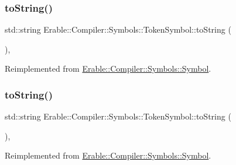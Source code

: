\mbox{\label{class_erable_1_1_compiler_1_1_symbols_1_1_token_symbol_a0f8499152ff070ae70295c9b25b25b93}} 
\subsubsection{\texorpdfstring{toString()}{toString()}\hspace{0.1cm}{\footnotesize\ttfamily [1/2]}}
{\footnotesize\ttfamily std\+::string Erable\+::\+Compiler\+::\+Symbols\+::\+Token\+Symbol\+::to\+String (\begin{DoxyParamCaption}{ }\end{DoxyParamCaption})\hspace{0.3cm}{\ttfamily [override]}, {\ttfamily [virtual]}}



Reimplemented from \mbox{\hyperlink{class_erable_1_1_compiler_1_1_symbols_1_1_symbol_af5ccb3fb3201fd88ab6ce0e495416c82}{Erable\+::\+Compiler\+::\+Symbols\+::\+Symbol}}.

\mbox{\label{class_erable_1_1_compiler_1_1_symbols_1_1_token_symbol_a0f8499152ff070ae70295c9b25b25b93}} 
\subsubsection{\texorpdfstring{toString()}{toString()}\hspace{0.1cm}{\footnotesize\ttfamily [2/2]}}
{\footnotesize\ttfamily std\+::string Erable\+::\+Compiler\+::\+Symbols\+::\+Token\+Symbol\+::to\+String (\begin{DoxyParamCaption}{ }\end{DoxyParamCaption})\hspace{0.3cm}{\ttfamily [override]}, {\ttfamily [virtual]}}



Reimplemented from \mbox{\hyperlink{class_erable_1_1_compiler_1_1_symbols_1_1_symbol_af5ccb3fb3201fd88ab6ce0e495416c82}{Erable\+::\+Compiler\+::\+Symbols\+::\+Symbol}}.



